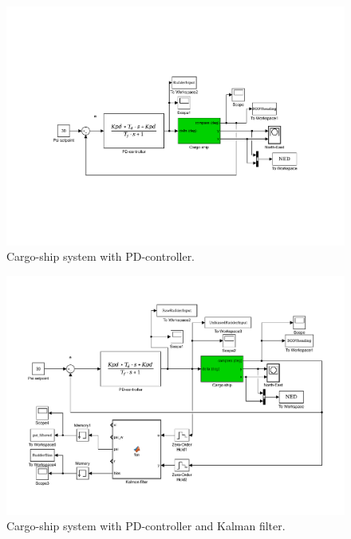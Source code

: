 \begin{figure}[!htb]
	\centering
	\includegraphics[trim=125 150 100 150, clip, width=\textwidth]{figures/models/p5p3_model.pdf}
	\caption{Cargo-ship system with PD-controller.}
\label{fig:p5p3_model}
\end{figure}

\begin{figure}[!htb]
	\centering
	\includegraphics[trim=50 75 25 50, clip, width=\textwidth]{figures/models/p5p5c_model.pdf}
	\caption{Cargo-ship system with PD-controller and Kalman filter.}
\label{fig:p5p5c_model}
\end{figure}

